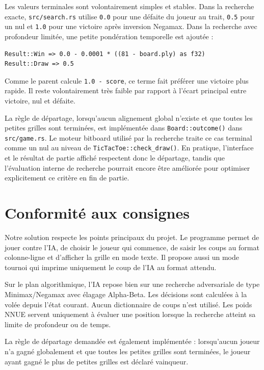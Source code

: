 \documentclass{pssbmac}
\begin{document}
Les valeurs terminales sont volontairement simples et stables. Dans la recherche exacte, \texttt{src/search.rs} utilise \texttt{0.0} pour une défaite du joueur au trait, \texttt{0.5} pour un nul et \texttt{1.0} pour une victoire après inversion Negamax. Dans la recherche avec profondeur limitée, une petite pondération temporelle est ajoutée :

\begin{lstlisting}[style=codeexcerpt,caption={Valeurs terminales utilisées par \texttt{src/search.rs}}]
Result::Win => 0.0 - 0.0001 * ((81 - board.ply) as f32)
Result::Draw => 0.5
\end{lstlisting}

Comme le parent calcule \texttt{1.0 - score}, ce terme fait préférer une victoire plus rapide. Il reste volontairement très faible par rapport à l'écart principal entre victoire, nul et défaite.

La règle de départage, lorsqu'aucun alignement global n'existe et que toutes les petites grilles sont terminées, est implémentée dans \texttt{Board::outcome()} dans \texttt{src/game.rs}. Le moteur bitboard utilisé par la recherche traite ce cas terminal comme un nul au niveau de \texttt{TicTacToe::check\_draw()}. En pratique, l'interface et le résultat de partie affiché respectent donc le départage, tandis que l'évaluation interne de recherche pourrait encore être améliorée pour optimiser explicitement ce critère en fin de partie.

\section{Conformité aux consignes}

Notre solution respecte les points principaux du projet. Le programme permet de jouer contre l'IA, de choisir le joueur qui commence, de saisir les coups au format colonne-ligne et d'afficher la grille en mode texte. Il propose aussi un mode tournoi qui imprime uniquement le coup de l'IA au format attendu.

Sur le plan algorithmique, l'IA repose bien sur une recherche adversariale de type Minimax/Negamax avec élagage Alpha-Beta. Les décisions sont calculées à la volée depuis l'état courant. Aucun dictionnaire de coups n'est utilisé. Les poids NNUE servent uniquement à évaluer une position lorsque la recherche atteint sa limite de profondeur ou de temps.

La règle de départage demandée est également implémentée : lorsqu'aucun joueur n'a gagné globalement et que toutes les petites grilles sont terminées, le joueur ayant gagné le plus de petites grilles est déclaré vainqueur.
\end{document}
